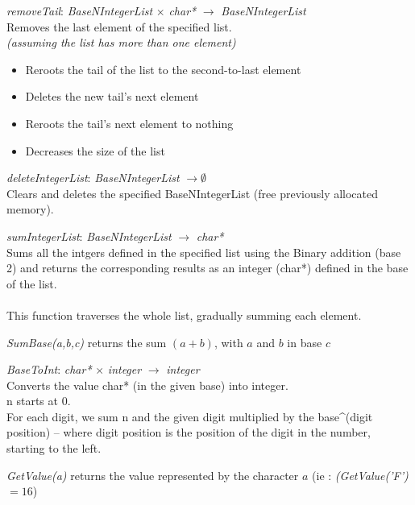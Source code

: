 \documentclass[book, backcover, english, nodocumentinfo]{upmethodology-document}
\begin{document}
		\begin{minipage}{\linewidth}
			\textit{removeTail}: \textit{BaseNIntegerList} $\times$ \textit{char*} $\rightarrow$ \textit{BaseNIntegerList}\\
			Removes the last element of the specified list.\\
			\ov \textit{ (assuming the list has more than one element)}
			\begin{itemize}
				\item Reroots the tail of the list to the second-to-last element
				\item Deletes the new tail's next element
				\item Reroots the tail's next element to nothing
				\item Decreases the size of the list
			\end{itemize}
			\label{algo:BNIL-RemoveTail}
			
		\end{minipage}
		\nxtalgo{}

		\begin{minipage}{\linewidth}
			\textit{deleteIntegerList}: \textit{BaseNIntegerList} $\rightarrow \emptyset$\\
			Clears and deletes the specified BaseNIntegerList (free previously allocated memory).\\
			\label{algo:BNIL-DeleteIntegerList}
			
		\end{minipage}
		\nxtalgo{}

		\begin{minipage}{\linewidth}
			\textit{sumIntegerList}: \textit{BaseNIntegerList} $\rightarrow$ \textit{char*}\\
			Sums all the intgers defined in the specified list using the Binary addition (base 2) and returns the corresponding results as an integer (char*) defined in the base of the list.\\
			\ov\\
			This function traverses the whole list, gradually summing each element.
			\label{algo:BNIL-SumIntegerList}
			
			\textit{SumBase(a,b,c)} returns the sum $(a+b)$, with $a$ and $b$ in base $c$
		\end{minipage}
		\nxtalgo{}

		\begin{minipage}{\linewidth}
			\textit{BaseToInt}: \textit{char*} $\times$ \textit{integer} $\rightarrow$ \textit{integer}\\
			Converts the value char* (in the given base) into integer.
			\ov\\
			n starts at 0.\\
			For each digit, we sum n and the given digit multiplied by the base^(digit position) -- where digit position is the position of the digit in the number, starting to the left.
			\label{algo:BNIL-BaseToInt}
			
			\textit{GetValue(a)} returns the value represented by the character $a$
			(ie : \textit{(GetValue('F')} $= 16$)
		\end{minipage}
		\nxtalgo{}
\end{document}
